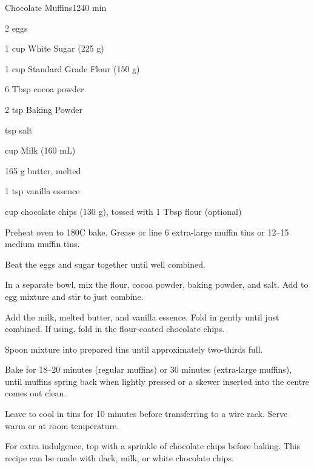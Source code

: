 \begin{recipebox}{Chocolate Muffins}{12}{40 min}
\begin{ingredients}
  \item 2 eggs
  \item 1 cup White Sugar (225 g)
  \item 1 cup Standard Grade Flour (150 g)
  \item 6 Tbsp cocoa powder
  \item 2 tsp Baking Powder
  \item {} tsp salt
  \item {} cup Milk (160 mL)
  \item 165 g butter, melted
  \item 1 tsp vanilla essence
  \item {} cup chocolate chips (130 g), tossed with 1 Tbsp flour (optional)
\end{ingredients}

\begin{method}
  \item Preheat oven to 180\degree C bake. Grease or line 6 extra-large muffin tins or 12–15 medium muffin tins.
  \item Beat the eggs and sugar together until well combined.
  \item In a separate bowl, mix the flour, cocoa powder, baking powder, and salt. Add to egg mixture and stir to just combine.
  \item Add the milk, melted butter, and vanilla essence. Fold in gently until just combined. If using, fold in the flour-coated chocolate chips.
  \item Spoon mixture into prepared tins until approximately two-thirds full.
  \item Bake for 18–20 minutes (regular muffins) or 30 minutes (extra-large muffins), until muffins spring back when lightly pressed or a skewer inserted into the centre comes out clean.
  \item Leave to cool in tins for 10 minutes before transferring to a wire rack. Serve warm or at room temperature.
\end{method}

\begin{notes}
For extra indulgence, top with a sprinkle of chocolate chips before baking.  
This recipe can be made with dark, milk, or white chocolate chips.  
\end{notes}
\end{recipebox}

